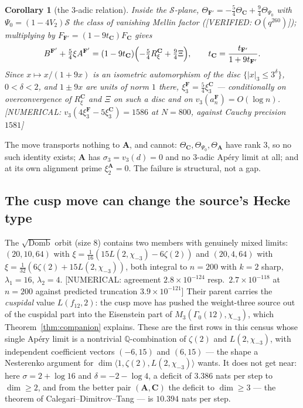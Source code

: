 \documentclass[11pt,reqno]{amsart}
\theoremstyle{plain}
\newtheorem{corollary}[theorem]{Corollary}
\theoremstyle{definition}
\theoremstyle{remark}
\theoremstyle{plain}
\newcommand{\Q}{\mathbb{Q}}
\newcommand{\VerifiedR}[1]{\textup{\textsf{[VERIFIED: #1]}}}
\newcommand{\Numerical}[1]{\textup{\textsf{[NUMERICAL: #1]}}}
\begin{document}
\begin{corollary}[the $3$-adic relation]\label{cor:3adic}
Inside the $\mathcal S$-plane,
$\Theta_{\mathbf F'}=-\tfrac54\Theta_{\mathbf C}+\tfrac94\Theta_{\Psi_0}$ with
$\Psi_0=(1-4V_2)\mathcal S$ the class of vanishing Mellin factor
\textup{(}\VerifiedR{$O(q^{260})$}\textup{)}; multiplying by
$F_{\mathbf F'}=(1-9t_{\mathbf C})F_{\mathbf C}$ gives
\[
B^{\mathbf F'}+\tfrac54\xi A^{\mathbf F'}
=(1-9t_{\mathbf C})\Bigl(-\tfrac54R^{\mathbf C}_\xi+\tfrac94\Xi\Bigr),
\qquad t_{\mathbf C}=\frac{t_{\mathbf F'}}{1+9t_{\mathbf F'}} .
\]
Since $x\mapsto x/(1+9x)$ is an isometric automorphism of the disc
$\{|x|_3\le3^{\delta}\}$, $0<\delta<2$, and $1\pm9x$ are units of norm $1$ there,
$\xi_3^{\mathbf F}=\tfrac54\xi_3^{\mathbf C}$ --- conditionally on
overconvergence of $R^{\mathbf C}_\xi$ and $\Xi$ on such a disc and on
$v_3(a_n^{\mathbf F})=O(\log n)$.
\Numerical{$v_3(4\xi_3^{\mathbf F}-5\xi_3^{\mathbf C})=1586$ at $N=800$, against
Cauchy precision $1581$}
\end{corollary}

The move transports nothing to $\mathbf A$, and cannot: $\Theta_{\mathbf C},
\Theta_{\Psi_0},\Theta_{\mathbf A}$ have rank $3$, so no such identity exists;
$\mathbf A$ has $\sigma_3=v_3(d)=0$ and no $3$-adic Ap\'ery limit at all; and at
its own alignment prime $\xi_2^{\mathbf A}=0$. The failure is structural, not a
gap.

\subsection{The cusp move can change the source's Hecke type}
The $\sqrt{\text{Domb}}$ orbit (size $8$) contains two members with genuinely
mixed limits: $(20,10,64)$ with
$\xi=\tfrac1{16}(15L(2,\chi_{-3})-6\zeta(2))$ and $(20,4,64)$ with
$\xi=\tfrac1{32}(6\zeta(2)+15L(2,\chi_{-3}))$, both integral to $n=200$ with
$k=2$ sharp, $\lambda_1=16$, $\lambda_2=4$.
\Numerical{agreement $2.8\times10^{-124}$ resp.\ $2.7\times10^{-118}$ at $n=200$
against predicted truncation $3.9\times10^{-121}$} Their parent carries the
\emph{cuspidal} value $L(f_{12},2)$: the cusp move has pushed the weight-three
source out of the cuspidal part into the Eisenstein part of
$M_3(\Gamma_0(12),\chi_{-3})$, which Theorem~\ref{thm:companion} explains. These
are the first rows in this census whose single Ap\'ery limit is a nontrivial
$\Q$-combination of $\zeta(2)$ and $L(2,\chi_{-3})$, with independent coefficient
vectors $(-6,15)$ and $(6,15)$ --- the shape a Nesterenko argument for
$\dim\langle1,\zeta(2),L(2,\chi_{-3})\rangle$ wants. It does not get near: here
$\sigma=2+\log16$ and $\delta=-2-\log4$, a deficit of $3.386$ nats per step to
$\dim\ge2$, and from the better pair $(\mathbf A,\mathbf C)$ the deficit to
$\dim\ge3$ --- the theorem of Calegari--Dimitrov--Tang \cite{CDT2024} --- is
$10.394$ nats per step.
\end{document}
